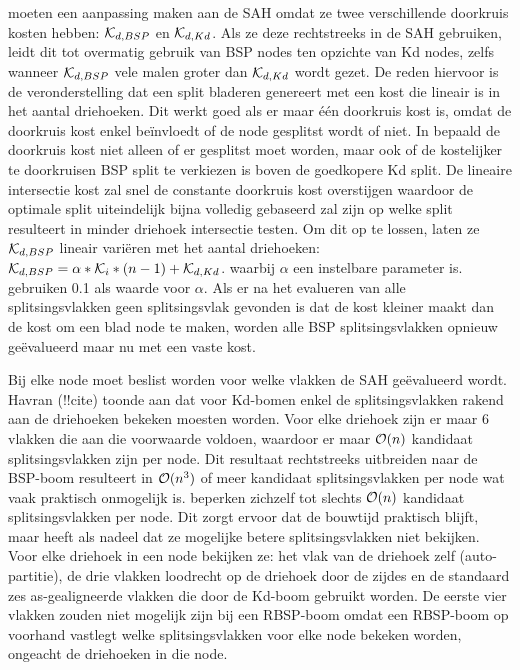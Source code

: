 \authorIze{ }moeten een aanpassing maken aan de SAH omdat ze twee verschillende doorkruis kosten hebben: $\mathcal{K}_{d,BSP}$ en $\mathcal{K}_{d,Kd}$.
Als ze deze rechtstreeks in de SAH gebruiken, leidt dit tot overmatig gebruik van BSP nodes ten opzichte van Kd nodes, zelfs wanneer $\mathcal{K}_{d,BSP}$ vele malen groter dan $\mathcal{K}_{d,Kd}$ wordt gezet.
De reden hiervoor is de veronderstelling dat een split bladeren genereert met een kost die lineair is in het aantal driehoeken.
Dit werkt goed als er maar één doorkruis kost is, omdat de doorkruis kost enkel beïnvloedt of de node gesplitst wordt of niet.
In \cite{Ize} bepaald de doorkruis kost niet alleen of er gesplitst moet worden, maar ook of de kostelijker te doorkruisen BSP split te verkiezen is boven de goedkopere Kd split.
De lineaire intersectie kost zal snel de constante doorkruis kost overstijgen waardoor de optimale split uiteindelijk bijna volledig gebaseerd zal zijn op welke split resulteert in minder driehoek intersectie testen.
Om dit op te lossen, laten ze $\mathcal{K}_{d,BSP}$ lineair variëren met het aantal driehoeken: $\mathcal{K}_{d,BSP} = \alpha * \mathcal{K}_i * (n - 1) + \mathcal{K}_{d,Kd}$. waarbij $\alpha$ een instelbare parameter is. \authorIze{ }gebruiken 0.1 als waarde voor $\alpha$.
Als er na het evalueren van alle splitsingsvlakken geen splitsingsvlak gevonden is dat de kost kleiner maakt dan de kost om een blad node te maken, worden alle BSP splitsingsvlakken opnieuw geëvalueerd maar nu met een vaste kost.

Bij elke node moet beslist worden voor welke vlakken de SAH geëvalueerd wordt. Havran (!!cite) toonde aan dat voor Kd-bomen enkel de splitsingsvlakken rakend aan de driehoeken bekeken moesten worden.
Voor elke driehoek zijn er maar 6 vlakken die aan die voorwaarde voldoen, waardoor er maar $\mathcal{O}(n)$ kandidaat splitsingsvlakken zijn per node.
Dit resultaat rechtstreeks uitbreiden naar de BSP-boom resulteert in $\mathcal{O}(n^3)$ of meer kandidaat splitsingsvlakken per node wat vaak praktisch onmogelijk is. 
\authorIze{ }beperken zichzelf tot slechts $\mathcal{O}(n)$ kandidaat splitsingsvlakken per node. 
Dit zorgt ervoor dat de bouwtijd praktisch blijft, maar heeft als nadeel dat ze mogelijke betere splitsingsvlakken niet bekijken.
Voor elke driehoek in een node bekijken ze: het vlak van de driehoek zelf (auto-partitie), de drie vlakken loodrecht op de driehoek door de zijdes en de standaard zes as-gealigneerde vlakken die door de Kd-boom gebruikt worden.
De eerste vier vlakken zouden niet mogelijk zijn bij een RBSP-boom omdat een RBSP-boom op voorhand vastlegt welke splitsingsvlakken voor elke node bekeken worden, ongeacht de driehoeken in die node.

